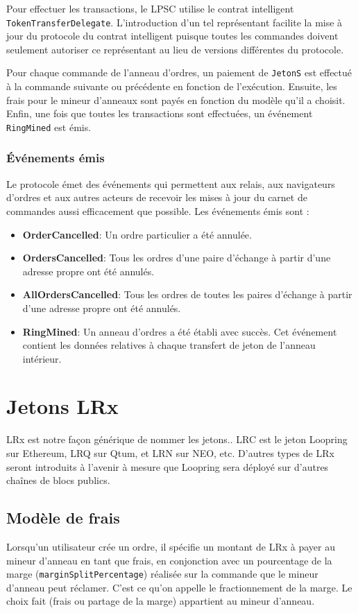 \documentclass[UTF8,nofonts]{article}
\begin{document}
\begin{multicols}{2}
Pour effectuer les transactions, le LPSC utilise le contrat intelligent \verb|TokenTransferDelegate|. L'introduction d'un tel représentant facilite la mise à jour du protocole du contrat intelligent puisque toutes les commandes doivent seulement autoriser ce représentant au lieu de versions différentes du protocole.

Pour chaque commande de l'anneau d'ordres, un paiement de \verb|JetonS| est effectué à la commande suivante ou précédente en fonction de l'exécution. Ensuite, les frais pour le mineur d’anneaux sont payés en fonction du modèle qu’il a choisit. Enfin, une fois que toutes les transactions sont effectuées, un événement \verb|RingMined| est émis.

\subsubsection{Événements émis\label{sec:events}}

Le protocole émet des événements qui permettent aux relais, aux navigateurs d'ordres et aux autres acteurs de recevoir les mises à jour du carnet de commandes aussi efficacement que possible. Les événements émis sont :

\begin{itemize}
	\item \textbf{OrderCancelled}: Un ordre particulier a été annulée.
	\item \textbf{OrdersCancelled}: Tous les ordres d'une paire d’échange à partir d'une adresse propre ont été annulés.
	\item \textbf{AllOrdersCancelled}: Tous les ordres de toutes les paires d’échange à partir d'une adresse propre ont été annulés.
	\item \textbf{RingMined}: Un anneau d'ordres a été établi avec succès. Cet événement contient les données relatives à chaque transfert de jeton de l'anneau intérieur.
\end{itemize}


\section{Jetons LRx\label{sec:token}}
LRx est notre façon générique de nommer les jetons.. LRC est le jeton Loopring sur Ethereum, LRQ sur Qtum, et LRN sur NEO, etc. D'autres types de LRx seront introduits à l'avenir à mesure que Loopring sera déployé sur d'autres chaînes de blocs publics.

\subsection{Modèle de frais\label{sec:fee_model}} 
Lorsqu'un utilisateur crée un ordre, il spécifie un montant de LRx à payer au mineur d’anneau en tant que frais, en conjonction avec un pourcentage de la marge (\verb|marginSplitPercentage|) réalisée sur la commande que le mineur d’anneau peut réclamer. C'est ce qu'on appelle le fractionnement de la marge. Le choix fait (frais ou partage de la marge) appartient  au mineur d’anneau.


\end{multicols}
\end{document}
